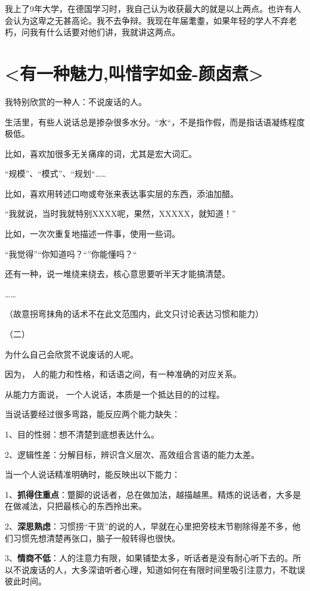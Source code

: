 \documentclass[UTF8,a4paper,8pt]{ctexbook}
\begin{document}
		我上了9年大学，在德国学习时，我自己认为收获最大的就是以上两点。也许有人会认为这卑之无甚高论。我不去争辩。我现在年届耄耋，如果年轻的学人不弃老朽，问我有什么话要对他们讲，我就讲这两点。
		
\newpage
\section{<有一种魅力,叫惜字如金-颜卤煮>}
		我特别欣赏的一种人：不说废话的人。
		
		生活里，有些人说话总是掺杂很多水分。“水“，不是指作假，而是指话语凝练程度极低。
		
		比如，喜欢加很多无关痛痒的词，尤其是宏大词汇。
		
		“规模”、“模式”、“规划“……
		
		比如，喜欢用转述口吻或夸张来表达事实层的东西，添油加醋。
		
		“我就说，当时我就特别XXXX呢，果然，XXXXX，就知道！”
		
		比如，一次次重复地描述一件事，使用一些词。
		
		“我觉得”“你知道吗？“”你能懂吗？“
		
		还有一种，说一堆绕来绕去，核心意思要听半天才能搞清楚。
		
		……
		
		（故意拐弯抹角的话术不在此文范围内，此文只讨论表达习惯和能力）
		
		
		
		（二）
		
		为什么自己会欣赏不说废话的人呢。
		
		因为， 人的能力和性格，和话语之间，有一种准确的对应关系。
		
		从能力方面说， 一个人说话，本质是一个抵达目的的过程。
		
		当说话要经过很多弯路，能反应两个能力缺失：
		
		1、目的性弱：想不清楚到底想表达什么。
		
		2、逻辑性差：分解目标，辨识含义层次、高效组合言语的能力太差。
		
		当一个人说话精准明确时，能反映出以下能力：
		
		1、\textbf{抓得住重点}：蹩脚的说话者，总在做加法，越描越黑。精炼的说话者，大多是在做减法，只把最核心的东西拎出来。
		
		2、\textbf{深思熟虑}：习惯捞“干货”的说的人，早就在心里把旁枝末节剔除得差不多，他们习惯先想清楚再张口，脑子一般转得也很快。
		
		3、\textbf{情商不低}：人的注意力有限，如果铺垫太多，听话者是没有耐心听下去的。所以不说废话的人，大多深谙听者心理，知道如何在有限时间里吸引注意力，不耽误彼此时间。
		
\end{document}
